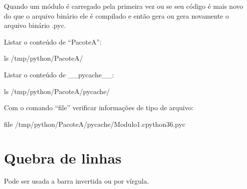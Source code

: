\documentclass[letterpaper,10pt,brazil]{sphinxmanual}
\begin{document}
Quando um módulo é carregado pela primeira vez ou se seu código é mais novo do que o arquivo binário ele é compilado e então gera ou gera novamente o arquivo binário .pyc.

Listar o conteúdo de “PacoteA”:

\begin{sphinxVerbatim}[commandchars=\\\{\}]
ls /tmp/python/PacoteA/
\end{sphinxVerbatim}

\begin{sphinxVerbatim}[commandchars=\\\{\}]
\end{sphinxVerbatim}

Listar o conteúdo de \_\_pycache\_\_:

\begin{sphinxVerbatim}[commandchars=\\\{\}]
ls /tmp/python/PacoteA/\PYGZus{}\PYGZus{}pycache\PYGZus{}\PYGZus{}/
\end{sphinxVerbatim}

\begin{sphinxVerbatim}[commandchars=\\\{\}]
\end{sphinxVerbatim}

Com o comando “file” verificar informações de tipo de arquivo:

\begin{sphinxVerbatim}[commandchars=\\\{\}]
file /tmp/python/PacoteA/\PYGZus{}\PYGZus{}pycache\PYGZus{}\PYGZus{}/Modulo1.cpython\PYGZhy{}36.pyc
\end{sphinxVerbatim}

\begin{sphinxVerbatim}[commandchars=\\\{\}]
\end{sphinxVerbatim}


\section{Quebra de linhas}
\label{\detokenize{content/language_particularities:quebra-de-linhas}}
Pode ser usada a barra invertida ou por vírgula.
\end{document}
